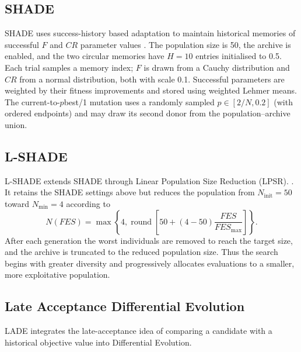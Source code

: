 \documentclass[review]{elsarticle}
\begin{document}
\subsection{SHADE}

SHADE uses success-history based adaptation to maintain historical
memories of successful $F$ and $CR$ parameter values
\citep{tanabe2013shade}. The population size is 50, the archive is enabled,
and the two circular memories have $H=10$ entries initialised to 0.5. Each
trial samples a memory index; $F$ is drawn from a Cauchy distribution and
$CR$ from a normal distribution, both with scale 0.1. Successful parameters
are weighted by their fitness improvements and stored using weighted Lehmer
means. The current-to-$p$best/1 mutation uses a randomly sampled
$p\in[2/N,0.2]$ (with ordered endpoints) and may draw its second donor from
the population--archive union.


\subsection{L-SHADE}

L-SHADE extends SHADE through Linear Population Size Reduction (LPSR).
\citep{tanabe2014lshade}. It retains the SHADE settings above but reduces
the population from $N_{\mathrm{init}}=50$ toward $N_{\min}=4$ according to
\begin{equation}
N(FES)=\max\left\{4,\operatorname{round}\left[
50+(4-50)\frac{FES}{FES_{\max}}\right]\right\}.
\end{equation}
After each generation the worst individuals are removed to reach the target
size, and the archive is truncated to the reduced population size. Thus the
search begins with greater diversity and progressively allocates evaluations
to a smaller, more exploitative population.


\subsection{Late Acceptance Differential Evolution}

LADE integrates the late-acceptance idea of comparing a candidate with a
historical objective value \citep{burke2017late} into Differential Evolution.
\end{document}
